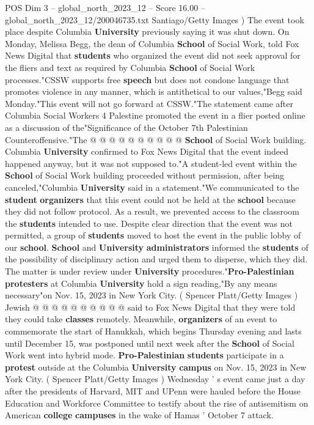 \begin{textsample}{POS Dim 3 – global\_north\_2023\_12 – Score 16.00 – global\_north\_2023\_12/200046735.txt}
Santiago/Getty Images ) The event took place despite Columbia \textbf{University} previously saying it was shut down.
On Monday, Melissa Begg, the dean of Columbia \textbf{School} of Social Work, told Fox News Digital that \textbf{students} who organized the event did not seek approval for the fliers and text as required by Columbia \textbf{School} of Social Work processes."CSSW supports free \textbf{speech} but does not condone language that promotes violence in any manner, which is antithetical to our values,"Begg said Monday."This event will not go forward at CSSW."The statement came after Columbia Social Workers 4 Palestine promoted the event in a flier posted online as a discussion of the"Significance of the October 7th Palestinian Counteroffensive."The @ @ @ @ @ @ @ @ @ @ \textbf{School} of Social Work building.
Columbia \textbf{University} confirmed to Fox News Digital that the event indeed happened anyway, but it was not supposed to."A student-led event within the \textbf{School} of Social Work building proceeded without permission, after being canceled,"Columbia \textbf{University} said in a statement."We communicated to the \textbf{student} \textbf{organizers} that this event could not be held at the \textbf{school} because they did not follow protocol.
As a result, we prevented access to the classroom the \textbf{students} intended to use.
Despite clear direction that the event was not permitted, a group of \textbf{students} moved to host the event in the public lobby of our \textbf{school}. \textbf{School} and \textbf{University} \textbf{administrators} informed the \textbf{students} of the possibility of disciplinary action and urged them to disperse, which they did.
The matter is under review under \textbf{University} procedures."\textbf{Pro-Palestinian} \textbf{protesters} at Columbia \textbf{University} hold a sign reading,"By any means necessary"on Nov. 15, 2023 in New York City. ( Spencer Platt/Getty Images ) Jewish @ @ @ @ @ @ @ @ @ @ said to Fox News Digital that they were told they could take \textbf{classes} remotely.
Meanwhile, \textbf{organizers} of an event to commemorate the start of Hanukkah, which begins Thursday evening and lasts until December 15, was postponed until next week after the \textbf{School} of Social Work went into hybrid mode. \textbf{Pro-Palestinian} \textbf{students} participate in a \textbf{protest} outside at the Columbia \textbf{University} \textbf{campus} on Nov. 15, 2023 in New York City. ( Spencer Platt/Getty Images ) Wednesday ' s event came just a day after the presidents of Harvard, MIT and UPenn were hauled before the House Education and Workforce Committee to testify about the rise of antisemitism on American \textbf{college} \textbf{campuses} in the wake of Hamas ' October 7 attack.

\end{textsample}
